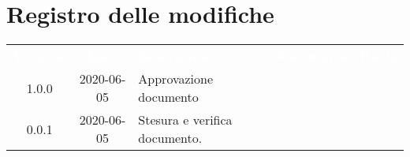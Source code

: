\section*{Registro delle modifiche}
{
	\centering
	\begin{longtable}{ c c C{4cm}  C{4cm}  C{3cm} }
		\textcolor{white}{\textbf{Versione}} & \textcolor{white}{\textbf{Data}} & \textcolor{white}{\textbf{Descrizione}} & \textcolor{white}{\textbf{Nominativo}} & \textcolor{white}{\textbf{Ruolo}}\\		
		1.0.0 & 2020-06-05 & Approvazione documento &  &\RdP{}\\		
		0.0.1 & 2020-06-05 & Stesura e verifica documento. &  \newline  &\reda{} \newline \ver{} \\		
		
	\end{longtable}

}